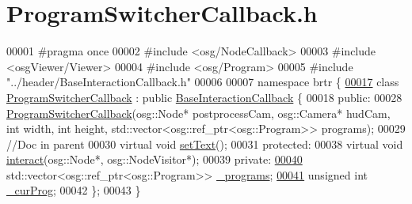 \hypertarget{_program_switcher_callback_8h_source}{\section{Program\+Switcher\+Callback.\+h}
\label{_program_switcher_callback_8h_source}
}

\begin{DoxyCode}
00001 \textcolor{preprocessor}{#pragma once}
00002 \textcolor{preprocessor}{#include <osg/NodeCallback>}
00003 \textcolor{preprocessor}{#include <osgViewer/Viewer>}
00004 \textcolor{preprocessor}{#include <osg/Program>}
00005 \textcolor{preprocessor}{#include "../header/BaseInteractionCallback.h"}
00006 
00007 \textcolor{keyword}{namespace }brtr \{
\hypertarget{_program_switcher_callback_8h_source_l00017}{}\hyperlink{classbrtr_1_1_program_switcher_callback}{00017}     \textcolor{keyword}{class }\hyperlink{classbrtr_1_1_program_switcher_callback}{ProgramSwitcherCallback} : \textcolor{keyword}{public} 
      \hyperlink{classbrtr_1_1_base_interaction_callback}{BaseInteractionCallback} \{
00018     \textcolor{keyword}{public}:
00028         \hyperlink{classbrtr_1_1_program_switcher_callback_a36a59e70c5db59a00f2d7fd7fbf9e505}{ProgramSwitcherCallback}(osg::Node* postprocessCam, osg::Camera* hudCam, \textcolor{keywordtype}{int} 
      width, \textcolor{keywordtype}{int} height, std::vector<osg::ref\_ptr<osg::Program>> programs);
00029         \textcolor{comment}{//Doc in parent}
00030         \textcolor{keyword}{virtual} \textcolor{keywordtype}{void} \hyperlink{classbrtr_1_1_program_switcher_callback_a2202619d98a432578c8ed7342b957638}{setText}();
00031     \textcolor{keyword}{protected}:
00038         \textcolor{keyword}{virtual} \textcolor{keywordtype}{void} \hyperlink{classbrtr_1_1_program_switcher_callback_a06dd3fc2b09d3138e67599d8d56db62a}{interact}(osg::Node*, osg::NodeVisitor*);
00039     \textcolor{keyword}{private}:
\hypertarget{_program_switcher_callback_8h_source_l00040}{}\hyperlink{classbrtr_1_1_program_switcher_callback_a9cbcf4d65f6ee468bb20d16b9e795e49}{00040}         std::vector<osg::ref\_ptr<osg::Program>> \hyperlink{classbrtr_1_1_program_switcher_callback_a9cbcf4d65f6ee468bb20d16b9e795e49}{\_programs};
\hypertarget{_program_switcher_callback_8h_source_l00041}{}\hyperlink{classbrtr_1_1_program_switcher_callback_a06ee6d68fe703e6a88960219b019f1bd}{00041}         \textcolor{keywordtype}{unsigned} \textcolor{keywordtype}{int} \hyperlink{classbrtr_1_1_program_switcher_callback_a06ee6d68fe703e6a88960219b019f1bd}{\_curProg};
00042     \};
00043 \}
\end{DoxyCode}
